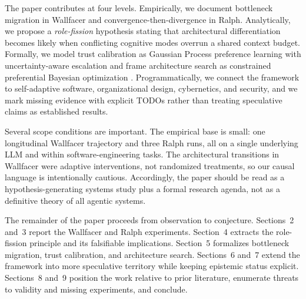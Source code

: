 The paper contributes at four levels. Empirically, we document bottleneck migration in Wallfacer and convergence-then-divergence in Ralph. Analytically, we propose a \emph{role-fission} hypothesis stating that architectural differentiation becomes likely when conflicting cognitive modes overrun a shared context budget. Formally, we model trust calibration as Gaussian Process preference learning with uncertainty-aware escalation and frame architecture search as constrained preferential Bayesian optimization \cite{chu2005,gonzalez2017}. Programmatically, we connect the framework to self-adaptive software, organizational design, cybernetics, and security, and we mark missing evidence with explicit TODOs rather than treating speculative claims as established results.

Several scope conditions are important. The empirical base is small: one longitudinal Wallfacer trajectory and three Ralph runs, all on a single underlying LLM and within software-engineering tasks. The architectural transitions in Wallfacer were adaptive interventions, not randomized treatments, so our causal language is intentionally cautious. Accordingly, the paper should be read as a hypothesis-generating systems study plus a formal research agenda, not as a definitive theory of all agentic systems.

The remainder of the paper proceeds from observation to conjecture. Sections~2 and~3 report the Wallfacer and Ralph experiments. Section~4 extracts the role-fission principle and its falsifiable implications. Section~5 formalizes bottleneck migration, trust calibration, and architecture search. Sections~6 and~7 extend the framework into more speculative territory while keeping epistemic status explicit. Sections~8 and~9 position the work relative to prior literature, enumerate threats to validity and missing experiments, and conclude.
